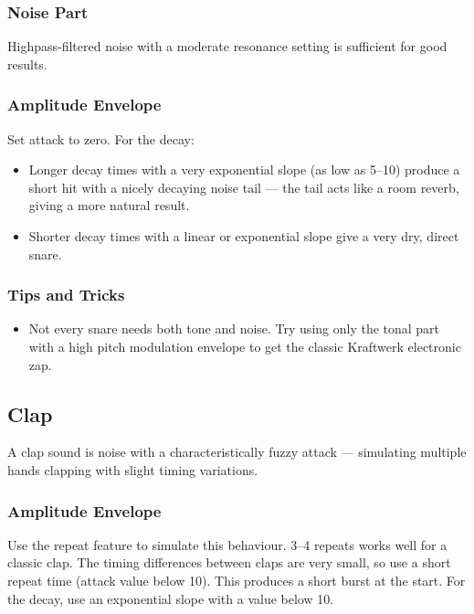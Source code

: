 \subsubsection{Noise Part}\label{noise-part}

Highpass-filtered noise with a moderate resonance setting is sufficient
for good results.

\subsubsection{Amplitude Envelope}\label{amplitude-envelope-1}

Set attack to zero. For the decay:

\begin{itemize}
\tightlist
\item
  Longer decay times with a very exponential slope (as low as 5--10)
  produce a short hit with a nicely decaying noise tail --- the tail
  acts like a room reverb, giving a more natural result.
\item
  Shorter decay times with a linear or exponential slope give a very
  dry, direct snare.
\end{itemize}

\subsubsection{Tips and Tricks}\label{tips-and-tricks-1}

\begin{itemize}
\tightlist
\item
  Not every snare needs both tone and noise. Try using only the tonal
  part with a high pitch modulation envelope to get the classic
  Kraftwerk electronic zap.
\end{itemize}

\subsection{Clap}\label{clap}

A clap sound is noise with a characteristically fuzzy attack ---
simulating multiple hands clapping with slight timing variations.

\subsubsection{Amplitude Envelope}\label{amplitude-envelope-2}

Use the repeat feature to simulate this behaviour. 3--4 repeats works
well for a classic clap. The timing differences between claps are very
small, so use a short repeat time (attack value below 10). This produces
a short burst at the start. For the decay, use an exponential slope with
a value below 10.


